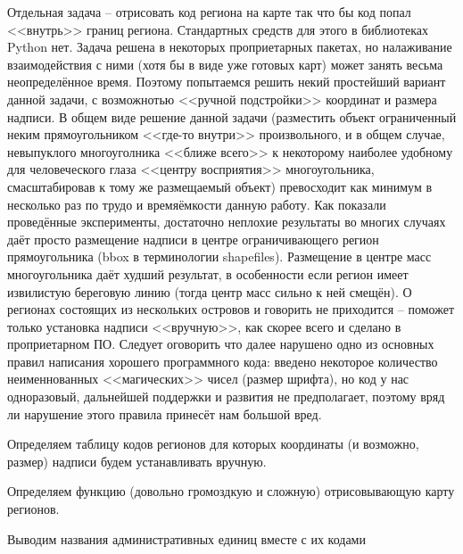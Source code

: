 \documentclass[11pt]{article}
\begin{document}
    Отдельная задача -- отрисовать код региона на карте так что бы код попал
<<внутрь>> границ региона. Стандартных средств для этого в
библиотеках Python нет. Задача решена в некоторых проприетарных пакетах,
но налаживание взаимодействия с ними (хотя бы в виде уже готовых карт)
может занять весьма неопределённое время. Поэтому попытаемся решить
некий простейший вариант данной задачи, с возможнотью
<<ручной подстройки>> координат и размера надписи. В общем виде
решение данной задачи (разместить объект ограниченный неким
прямоугольником <<где-то внутри>> произвольного, и в общем случае,
невыпуклого многоуголника <<ближе всего>> к некоторому наиболее
удобному для человеческого глаза <<центру восприятия>>
многоугольника, смасштабировав к тому же размещаемый объект) превосходит
как минимум в несколько раз по трудо и времяёмкости данную работу. Как
показали проведённые эксперименты, достаточно неплохие результаты во
многих случаях даёт просто размещение надписи в центре ограничивающего
регион прямоугольника (bbox в терминологии shapefiles). Размещение в
центре масс многоугольника даёт худший результат, в особенности если
регион имеет извилистую береговую линию (тогда центр масс сильно к ней
смещён). О регионах состоящих из нескольких островов и говорить не
приходится -- поможет только установка надписи <<вручную>>, как
скорее всего и сделано в проприетарном ПО. Следует оговорить что далее
нарушено одно из основных правил написания хорошего программного кода:
введено некоторое количество неименнованных <<магических>> чисел
(размер шрифта), но код у нас одноразовый, дальнейшей поддержки и
развития не предполагает, поэтому вряд ли нарушение этого правила
принесёт нам большой вред.


    Определяем таблицу кодов регионов для которых координаты (и возможно,
размер) надписи будем устанавливать вручную.


    Определяем функцию (довольно громоздкую и сложную) отрисовывающую карту
регионов.


    Выводим названия административных единиц вместе с их кодами
\end{document}
